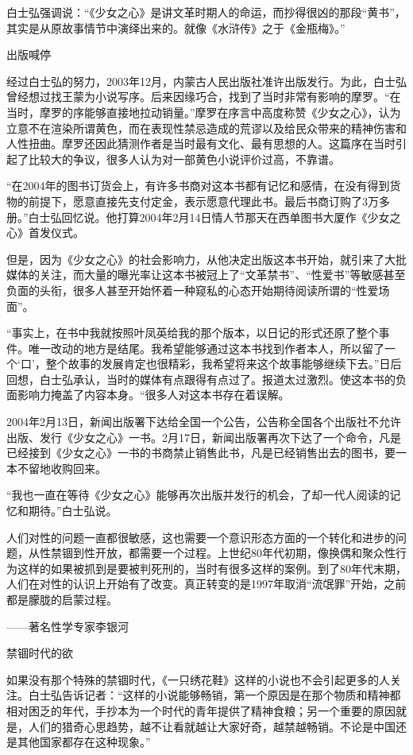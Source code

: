 \documentclass[12pt,UTF8]{ctexbook}
\begin{document}
白士弘强调说：“《少女之心》是讲文革时期人的命运，而抄得很凶的那段“黄书”，其实是从原故事情节中演绎出来的。就像《水浒传》之于《金瓶梅》。”

出版喊停

经过白士弘的努力，2003年12月，内蒙古人民出版社准许出版发行。为此，白士弘曾经想过找王蒙为小说写序。后来因缘巧合，找到了当时非常有影响的摩罗。“在当时，摩罗的序能够直接地拉动销量。”摩罗在序言中高度称赞《少女之心》，认为立意不在渲染所谓黄色，而在表现性禁忌造成的荒谬以及给民众带来的精神伤害和人性扭曲。摩罗还因此猜测作者是当时最有文化、最有思想的人。这篇序在当时引起了比较大的争议，很多人认为对一部黄色小说评价过高，不靠谱。

“在2004年的图书订货会上，有许多书商对这本书都有记忆和感情，在没有得到货物的前提下，愿意直接先支付定金，表示愿意代理此书。最后书商订购了3万多册。”白士弘回忆说。他打算2004年2月14日情人节那天在西单图书大厦作《少女之心》首发仪式。

但是，因为《少女之心》的社会影响力，从他决定出版这本书开始，就引来了大批媒体的关注，而大量的曝光率让这本书被冠上了“文革禁书”、“性爱书”等敏感甚至负面的头衔，很多人甚至开始怀着一种窥私的心态开始期待阅读所谓的“性爱场面”。

“事实上，在书中我就按照叶凤英给我的那个版本，以日记的形式还原了整个事件。唯一改动的地方是结尾。我希望能够通过这本书找到作者本人，所以留了一个‘口’，整个故事的发展肯定也很精彩，我希望将来这个故事能够继续下去。”日后回想，白士弘承认，当时的媒体有点跟得有点过了。报道太过激烈。使这本书的负面影响力掩盖了内容本身。“很多人对这本书存在着误解。

2004年2月13日，新闻出版署下达给全国一个公告，公告称全国各个出版社不允许出版、发行《少女之心》一书。2月17日，新闻出版署再次下达了一个命令，凡是已经接到《少女之心》一书的书商禁止销售此书，凡是已经销售出去的图书，要一本不留地收购回来。

“我也一直在等待《少女之心》能够再次出版并发行的机会，了却一代人阅读的记忆和期待。”白士弘说。

人们对性的问题一直都很敏感，这也需要一个意识形态方面的一个转化和进步的问题，从性禁锢到性开放，都需要一个过程。上世纪80年代初期，像换偶和聚众性行为这样的如果被抓到是要被判死刑的，当时有很多这样的案例。到了80年代末期，人们在对性的认识上开始有了改变。真正转变的是1997年取消“流氓罪”开始，之前都是朦胧的启蒙过程。

——著名性学专家李银河

禁锢时代的欲

如果没有那个特殊的禁锢时代，《一只绣花鞋》这样的小说也不会引起更多的人关注。白士弘告诉记者：“这样的小说能够畅销，第一个原因是在那个物质和精神都相对困乏的年代，手抄本为一个时代的青年提供了精神食粮；另一个重要的原因就是，人们的猎奇心思趋势，越不让看就越让大家好奇，越禁越畅销。不论是中国还是其他国家都存在这种现象。”
\end{document}
